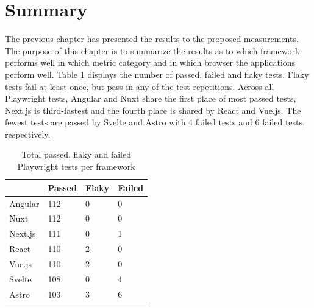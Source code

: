 \documentclass[a4paper, 12pt]{article}
\begin{document}
\section{Summary}\label{sec:summary}

The previous chapter has presented the results to the proposed measurements.
The purpose of this chapter is to summarize the results as to which framework performs well in which metric category and in which browser the applications perform well.
Table \ref{tab:playwright:total} displays the number of passed, failed and flaky tests.
Flaky tests fail at least once, but pass in any of the test repetitions.
Across all Playwright tests, Angular and Nuxt share the first place of most passed tests, Next.js is third-fastest and the fourth place is shared by React and Vue.js.
The fewest tests are passed by Svelte and Astro with 4 failed tests and 6 failed tests, respectively.

\begin{table}[!ht]
  \centering
  \begin{tabular}{|l|l|l|l|}
    \hline
    ~         & \textbf{Passed} & \textbf{Flaky}  & \textbf{Failed} \\ \hline
    Angular   & 112             & 0               & 0               \\ \hline
    Nuxt      & 112             & 0               & 0               \\ \hline
    Next.js   & 111             & 0               & 1               \\ \hline
    React     & 110             & 2               & 0               \\ \hline
    Vue.js    & 110             & 2               & 0               \\ \hline
    Svelte    & 108             & 0               & 4               \\ \hline
    Astro     & 103             & 3               & 6               \\ \hline
  \end{tabular}
  \caption{Total passed, flaky and failed Playwright tests per framework}
  \label{tab:playwright:total}
\end{table}
\end{document}

